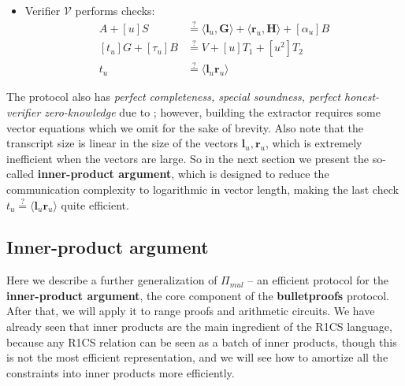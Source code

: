 \documentclass[../../book.tex]{subfiles}
\begin{document}
\begin{definition}
\begin{itemize}
\begin{equation}
            \end{equation}
            and sends $(\mathbf{l}_u, \mathbf{r}_u, t_u, \alpha_u, \tau_u)$ to $\mathcal{V}$.
        \item Verifier $\mathcal{V}$ performs checks: 
            \begin{equation}
                \begin{aligned}
                    A + [u]S &\stackrel{\text{?}}{=} \langle \mathbf{l}_u, \mathbf{G} \rangle + \langle \mathbf{r}_u, \mathbf{H} \rangle + [\alpha_u]B \\
                    [t_u]G + [\tau_u]B &\stackrel{\text{?}}{=} V + [u]T_1 + [u^2]T_2 \\
                    t_u &\stackrel{\text{?}}{=} \langle \mathbf{l}_u \mathbf{r}_u \rangle
                \end{aligned}
            \end{equation}
    \end{itemize}
\end{definition}

The protocol also has \textit{perfect completeness, special soundness, perfect honest-verifier zero-knowledge} due to ; however, building the extractor requires some vector equations which we omit for the sake of brevity. Also note that the transcript size is linear in the size of the vectors $\mathbf{l}_u, \mathbf{r}_u$, which is extremely inefficient when the vectors are large. So in the next section we present the so-called \textbf{inner-product argument}, which is designed to reduce the communication complexity to logarithmic in vector length, making the last check $t_u \stackrel{\text{?}}{=} \langle \mathbf{l}_u \mathbf{r}_u \rangle$ quite efficient.

\subsection{Inner-product argument}

Here we describe a further generalization of $\Pi_{mul}$ -- an efficient protocol for the \textbf{inner-product argument}, the core component of the \textbf{bulletproofs} protocol. After that, we will apply it to range proofs and arithmetic circuits. We have already seen that inner products are the main ingredient of the R1CS language, because any R1CS relation can be seen as a batch of inner products, though this is not the most efficient representation, and we will see how to amortize all the constraints into inner products more efficiently.
\end{document}
